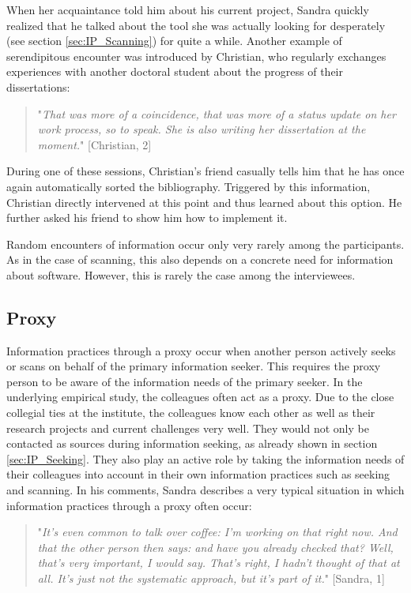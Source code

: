 \documentclass[12pt, a4paper, titlepage, oneside, abstract=true, toc=listof, toc=bibliography, BCOR=1cm]{scrreprt}
\begin{document}
{When her acquaintance told him about his current project, Sandra quickly realized that he talked about the tool she was actually looking for desperately (see section \ref{sec:IP_Scanning}) for quite a while. Another example of serendipitous encounter was introduced by Christian, who regularly exchanges experiences with another doctoral student about the progress of their dissertations:

\begin{quotation}
"\textit{That was more of a coincidence, that was more of a status update on her work process, so to speak. She is also writing her dissertation at the moment.}" [Christian, 2]
\end{quotation}

During one of these sessions, Christian's friend casually tells him that he has once again automatically sorted the bibliography. Triggered by this information, Christian directly intervened at this point and thus learned about this option. He further asked his friend to show him how to implement it. 

Random encounters of information occur only very rarely among the participants. As in the case of scanning, this also depends on a concrete need for information about software. However, this is rarely the case among the interviewees. 

\subsection{Proxy}
\label{sec:IP_Proxy}
Information practices through a proxy occur when another person actively seeks or scans on behalf of the primary information seeker. 
This requires the proxy person to be aware of the information needs of the primary seeker. In the underlying empirical study, the colleagues often act as a proxy. Due to the close collegial ties at the institute, the colleagues know each other as well as their research projects and current challenges very well. They would not only be contacted as sources during information seeking, as already shown in section \ref{sec:IP_Seeking}. They also play an active role by taking the information needs of their colleagues into account in their own information practices such as seeking and scanning. In his comments, Sandra describes a very typical situation in which information practices through a proxy often occur:

\begin{quotation}
"\textit{It's even common to talk over coffee: I'm working on that right now.  And that the other person then says: and have you already checked that? Well, that's very important, I would say. That's right, I hadn't thought of that at all. It's just not the systematic approach, but it's part of it.}" [Sandra, 1]
\end{quotation}

}
\end{document}
